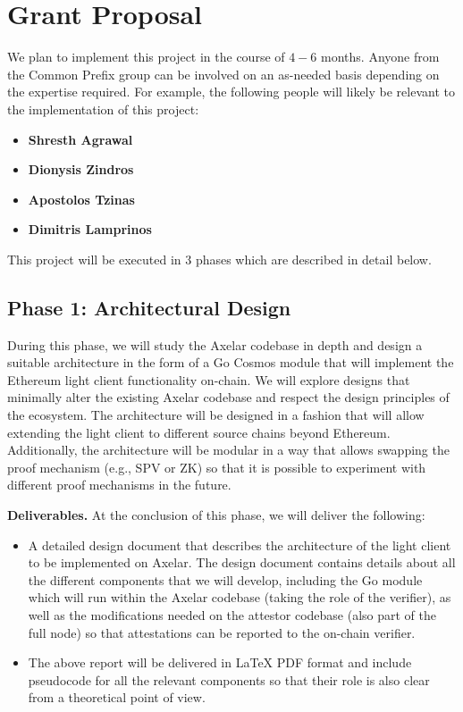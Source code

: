 \section{Grant Proposal}

We plan to implement this project in the course of $4-6$ months. Anyone from the Common Prefix group
can be involved on an as-needed basis depending on the expertise required. For example, the following
people will likely be relevant to the implementation of this project:

\begin{itemize}
  \item \textbf{Shresth Agrawal}
  \item \textbf{Dionysis Zindros}
  \item \textbf{Apostolos Tzinas}
  \item \textbf{Dimitris Lamprinos}
\end{itemize}

This project will be executed in $3$ phases which are described in detail below.

\subsection{Phase 1: Architectural Design}
During this phase, we will study the Axelar codebase in depth and design a suitable architecture in the form of a Go Cosmos module that will implement the Ethereum light client functionality on-chain.
We will explore designs that minimally alter the existing Axelar codebase and respect the design principles of the ecosystem.
The architecture will be designed in a fashion that will allow extending the light client to different source chains beyond Ethereum. Additionally, the architecture will be modular in a way that allows swapping the proof mechanism (e.g., SPV or ZK) so that it is possible to experiment with different proof mechanisms in the future.

\noindent
\textbf{Deliverables.} At the conclusion of this phase, we will deliver the following:

\begin{itemize}
  \item A detailed design document that describes the architecture of the light client to be implemented on Axelar. The design document contains details about all the different components that we will develop, including the Go module which will run within the Axelar codebase (taking the role of the verifier), as well as the modifications needed on the attestor codebase (also part of the full node) so that attestations can be reported to the on-chain verifier.
  \item The above report will be delivered in LaTeX PDF format and include pseudocode for all the relevant components so that their role is also clear from a theoretical point of view.
\end{itemize}

